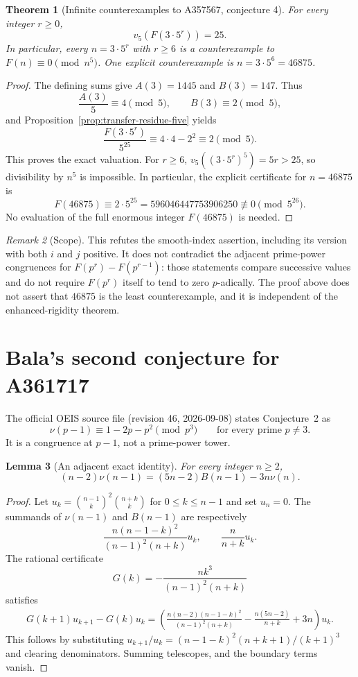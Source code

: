 \documentclass[11pt]{amsart}
\newtheorem{theorem}{Theorem}[section]
\newtheorem{lemma}[theorem]{Lemma}
\theoremstyle{definition}
\theoremstyle{remark}
\newtheorem{remark}[theorem]{Remark}
\begin{document}
\begin{theorem}[Infinite counterexamples to A357567, conjecture 4]
\label{thm:transfer-counterexample-five}
For every integer $r\ge0$,
\[
 \boxed{v_5\!\left(F(3\cdot5^r)\right)=25.}
\]
In particular, every $n=3\cdot5^r$ with $r\ge6$ is a counterexample to
$F(n)\equiv0\pmod{n^5}$. One explicit counterexample is
$n=3\cdot5^6=46875$.
\end{theorem}
\begin{proof}
The defining sums give $A(3)=1445$ and $B(3)=147$. Thus
\[
 \frac{A(3)}5\equiv4\pmod5,\qquad B(3)\equiv2\pmod5,
\]
and Proposition~\ref{prop:transfer-residue-five} yields
\[
 \frac{F(3\cdot5^r)}{5^{25}}
 \equiv4\cdot4-2^2\equiv2\pmod5.
\]
This proves the exact valuation. For $r\ge6$,
$v_5((3\cdot5^r)^5)=5r>25$, so divisibility by $n^5$ is impossible.
In particular, the explicit certificate for $n=46875$ is
\[
 F(46875)\equiv2\cdot5^{25}
 =596046447753906250\not\equiv0\pmod{5^{26}}.
\]
No evaluation of the full enormous integer $F(46875)$ is needed.
\end{proof}

\begin{remark}[Scope]
This refutes the smooth-index assertion, including its version with both
$i$ and $j$ positive. It does not contradict the adjacent prime-power
congruences for $F(p^r)-F(p^{r-1})$: those statements compare successive
values and do not require $F(p^r)$ itself to tend to zero $p$-adically.
The proof above does not assert that $46875$ is the least counterexample,
and it is independent of the enhanced-rigidity theorem.
\end{remark}

\section{Bala's second conjecture for A361717}
The official OEIS source file
\cite{A361717}
(revision 46, 2026-09-08) states Conjecture~2 as
\[
 \nu(p-1)\equiv1-2p-p^2\pmod{p^3}
 \qquad\text{for every prime }p\ne3.
\]
It is a congruence at $p-1$, not a prime-power tower.

\begin{lemma}[An adjacent exact identity]
For every integer $n\geq2$,
\[
 (n-2)\nu(n-1)=(5n-2)B(n-1)-3n\nu(n).
\]
\end{lemma}
\begin{proof}
Let $u_k=\binom{n-1}{k}^2\binom{n+k}{k}$ for $0\leq k\leq n-1$
and set $u_n=0$. The summands of $\nu(n-1)$ and $B(n-1)$ are
respectively
\[
 \frac{n(n-1-k)^2}{(n-1)^2(n+k)}u_k,
 \qquad \frac{n}{n+k}u_k.
\]
The rational certificate
\[
 G(k)=-\frac{nk^3}{(n-1)^2(n+k)}
\]
satisfies
\begin{align*}
 G(k+1)u_{k+1}-G(k)u_k
 =\left(\frac{n(n-2)(n-1-k)^2}{(n-1)^2(n+k)}
       -\frac{n(5n-2)}{n+k}+3n\right)u_k.
\end{align*}
This follows by substituting
$u_{k+1}/u_k=(n-1-k)^2(n+k+1)/(k+1)^3$ and clearing denominators.
Summing telescopes, and the boundary terms vanish.
\end{proof}
\end{document}
